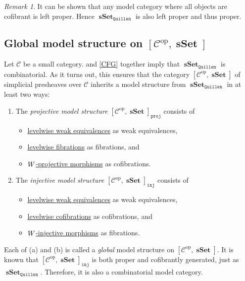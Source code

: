 \documentclass[10pt,letterpaper,cm]{nupset}
\theoremstyle{definition}
\theoremstyle{theorem}
\theoremstyle{remark}
\newtheorem{remark}[definition]{Remark}
\newcommand{\0}{\mathbf{0}}
\newcommand{\1}{\mathbf{1}}
\newcommand{\2}{\mathbf{2}}
\DeclareMathOperator{\op}{op}
\DeclareMathOperator{\sset}{\mathbf{sSet}}
\renewcommand{\c}{\mathscr{C}}
\DeclareMathOperator{\we}{\mathnormal{W}}
\newcommand{\bi}{\begin{itemize}}
\newcommand{\ei}{\end{itemize}}
\newcommand{\be}{\begin{enumerate}}
\newcommand{\ee}{\end{enumerate}}
\begin{document}
\begin{remark}
It can be shown that any model category where all objects are cofibrant is left proper. Hence $\sset_{\mathtt{Quillen}}$ is also left proper and thus proper.
\end{remark}

\subsection*{Global model structure on $\left[\c^{\op}, \sset\right]$}

Let $\c$ be a small category.  and \cref{CFG} together imply that $\sset_{\mathtt{Quillen}}$ is combinatorial. As it turns out, this ensures that the category $\left[\c^{\op}, \sset\right]$ of simplicial presheaves over $\c$ inherits a model structure from $\sset_{\mathtt{Quillen}}$ in at least two ways:

\be[label=(\alph*)]
\item The \textit{projective model structure  $\left[\c^{\op}, \sset\right]_{\mathtt{proj}}$} consists of
\bi
\item \underline{levelwise weak equivalences} as weak equivalences,
\item \underline{levelwise fibrations} as fibrations, and
\item \underline{$\we$-projective morphisms} as cofibrations. 
\ei
\item The \textit{injective model structure $\left[\c^{\op}, \sset\right]_{\mathtt{inj}}$} consists of
\bi
\item \underline{levelwise weak equivalences} as weak equivalences,
\item \underline{levelwise cofibrations} as cofibrations, and
\item  \underline{$\we$-injective morphisms} as fibrations. 
\ei
\ee

Each of (a) and (b) is called a \textit{global} model structure on $\left[\c^{\op}, \sset\right]$. It is known that $\left[\c^{\op}, \sset\right]_{\mathtt{inj}}$ is both proper and cofibrantly generated, just as $\sset_{\mathtt{Quillen}}$. Therefore, it is also a combinatorial model category.


\begin{comment}
\subsection{Reedy categories}


	
\end{comment}
\end{document}
